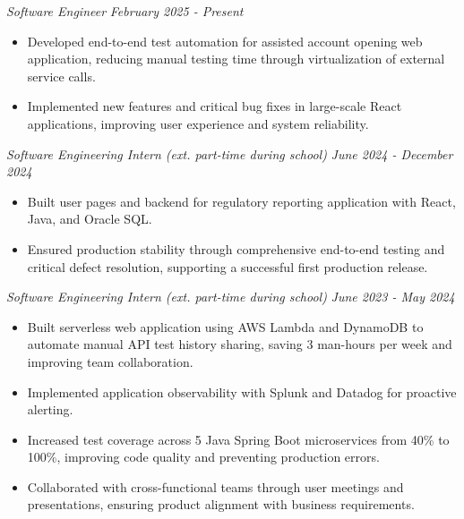 \documentclass[letterpaper]{article}
\begin{document}
    \textit{Software Engineer} \hfill \textsl{February 2025 - Present}\\
    \vspace{-7pt}
    \begin{itemize} \itemsep -1mm

            \item Developed end-to-end test automation for assisted account opening web application, reducing manual testing time through virtualization of external service calls.

            \item Implemented new features and critical bug fixes in large-scale React applications, improving user experience and system reliability.

    \end{itemize}
    \vspace{-2mm}
    
    \textit{Software Engineering Intern (ext. part-time during school)} \hfill \textsl{June 2024 - December 2024}\\
    \vspace{-7pt}
    \begin{itemize} \itemsep -1mm

            \item Built user pages and backend for regulatory reporting application with React, Java, and Oracle SQL.
            
            \item Ensured production stability through comprehensive end-to-end testing and critical defect resolution, supporting a successful first production release.
            
    \end{itemize}
    \vspace{-2mm}


    \textit{Software Engineering Intern (ext. part-time during school)} \hfill \textsl{June 2023 - May 2024}\\
    \vspace{-7pt}
    \begin{itemize} \itemsep -1mm
        
            \item Built serverless web application using AWS Lambda and DynamoDB to automate manual API test history sharing, saving 3 man-hours per week and improving team collaboration.            
            
            \item Implemented application observability with Splunk and Datadog for proactive alerting.

            \item Increased test coverage across 5 Java Spring Boot microservices from 40\% to 100\%, improving code quality and preventing production errors.

            \item Collaborated with cross-functional teams through user meetings and presentations, ensuring product alignment with business requirements.
                
    \end{itemize}
    \vspace{-2mm}
\end{document}
